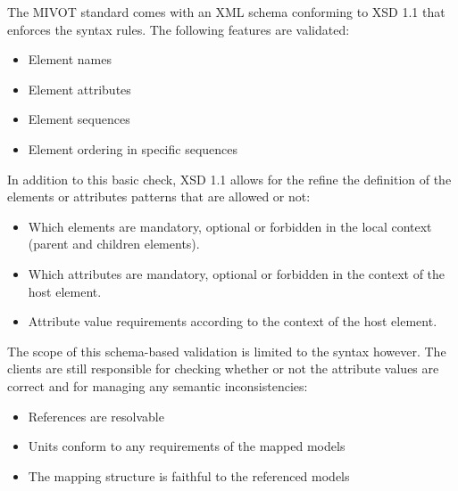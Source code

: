 The MIVOT standard comes with an XML schema conforming to XSD 1.1 \citep{std:xsd1.1} that enforces the syntax rules. 
The following features are validated:

\begin{itemize} 
  \item Element names 
  \item Element attributes
  \item Element sequences 
  \item Element ordering in specific sequences
\end{itemize}

In addition to this basic check, XSD 1.1 allows for the refine the definition of the elements or attributes  patterns that are allowed or not:

\begin{itemize} 
  \item Which elements are mandatory, optional  or forbidden in the local context  (parent and children elements).
  \item Which attributes are mandatory, optional  or forbidden in the context of the host element.
  \item Attribute value requirements according to the context of the host element.
\end{itemize}
 
The scope of this schema-based validation is limited to the syntax however. 
The clients are still responsible for checking whether or not the attribute values are correct and for managing any semantic inconsistencies:

\begin{itemize} 
  \item References are resolvable
  \item Units conform to any requirements of the mapped models
  \item The mapping structure is faithful to the referenced models
\end{itemize}


